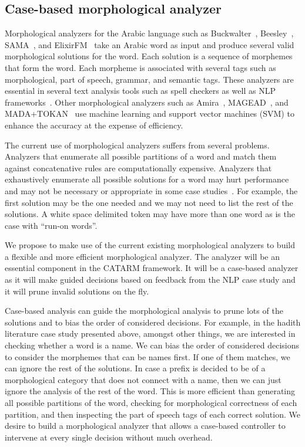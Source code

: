 \documentclass[12pt]{article}
\begin{document}
\subsection{Case-based morphological analyzer}
\label{s:design:ma}

Morphological analyzers for the Arabic language
such as Buckwalter~\cite{Buckwalter:02},
Beesley~\cite{Beesley:01}, SAMA~\cite{Kulick:10},
and ElixirFM~\cite{Otakar:07} take an Arabic word as input
and produce several valid morphological solutions for the word. 
Each solution is a sequence of morphemes that form the word.
Each morpheme is associated with several tags such as 
morphological, part of speech, grammar, and semantic tags. 
These analyzers are essential in several text analysis tools such 
as spell checkers as well as NLP frameworks~\cite{Col09}.
Other morphological analyzers such as 
Amira~\cite{Diab:07,Benajiba:07},
MAGEAD~\cite{Habash:05}, and MADA+TOKAN~\cite{Habash:09} 
use machine learning and support vector machines (SVM) 
to enhance the accuracy at the expense of efficiency.

The current use of morphological analyzers suffers from 
several problems. 
Analyzers that enumerate all possible partitions of a word
and match them against concatenative rules are computationally 
expensive. 
Analyzers that exhaustively enumerate all possible solutions 
for a word may hurt performance and may
not be necessary or appropriate in some case studies~\cite{Maamouri:10}. 
For example, the first solution may be the one needed and 
we may not need to list the rest of the solutions. 
A white space delimited token may have more than one word
as is the case with ``run-on words''.

We propose to make use of the current existing morphological
analyzers to build a flexible and more efficient
morphological analyzer. 
The analyzer will be an essential
component in the CATARM framework. 
It will be a case-based analyzer as it will make guided decisions
based on feedback from the NLP case study and it will prune
invalid solutions on the fly. 

Case-based analysis can guide the morphological analysis
to prune lots of the solutions and to bias the order of considered
decisions. 
For example, in the hadith literature case study presented above, 
amongst other things, we are interested in checking whether a 
word is a name.  
We can bias the order of considered decisions to consider the 
morphemes that can be names first. 
If one of them matches, we can ignore the rest of the solutions. 
In case a prefix is decided to be of a morphological category
that does not connect with a name, then we can just ignore
the analysis of the rest of the word. 
This is more efficient than generating all possible partitions
of the word, checking for morphological correctness of each 
partition, and then inspecting the part of speech tags of each
correct solution. 
We desire to build a morphological analyzer that allows a 
case-based controller to intervene at every single decision
without much overhead. 
\end{document}
